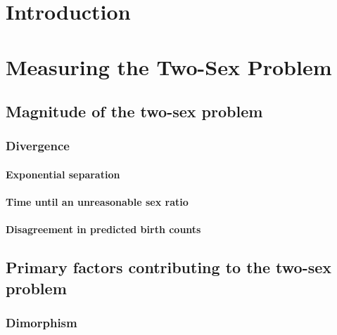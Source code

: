 \startthechapters 
 \chapter{Introduction}
 \label{chap:Intro}
 
 
\chapter{Measuring the Two-Sex Problem}

  \section{Magnitude of the two-sex problem}

    \subsection{Divergence}
      
      \subsubsection{Exponential separation}
        
      
      \subsubsection{Time until an unreasonable sex ratio}
        
      
      \subsubsection{Disagreement in predicted birth counts}
        
      
  \section{Primary factors contributing to the two-sex problem}

    \subsection{Dimorphism}
      
      
